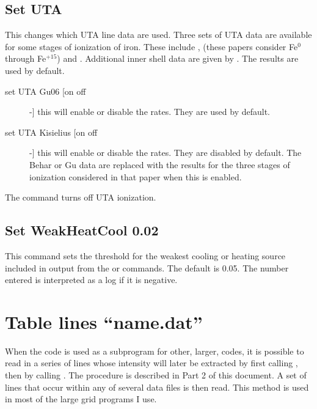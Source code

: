 \subsection{Set UTA}

This changes which UTA line data are used.
Three sets of UTA data are
available for some stages of ionization of iron.
These include \citet{Behar2001}, \citet{Gu2006}
(these papers consider Fe$^0$ through Fe$^{+15}$) and
\citet[this includes Fe$^{+13}$
though Fe$^{+15}$ but has many more lines]{Kisielius2003}.
Additional inner shell data are given by \citet{Behar2002}.
The \citet{Gu2006} results are used by default.
\begin{description}
\item[set UTA Gu06 [on off] -] this will enable or disable the \citet{Gu2006}
rates.  They are used by default.

\item[set UTA Kisielius [on off] -] this will enable or disable the \citet{Kisielius2003} rates.  They are disabled by default.  The Behar or Gu data
are replaced with the \citet{Kisielius2003} results for the three stages
of ionization considered in that paper when this is enabled.
\end{description}

The  command turns off UTA ionization.

\subsection{Set WeakHeatCool 0.02}

This command sets the threshold for the weakest cooling or heating source
included in output from the 
or  commands.
The default is 0.05.
The number entered is interpreted as a
log if it is negative.

\section{Table lines ``name.dat''}

When the code is used as a subprogram for other, larger, codes,
it is possible to read in a series of lines whose intensity will
later be extracted
by first calling ,
then by calling .
The procedure is
described in Part 2 of this document.
A set of lines that occur within
any of several data files is then read.
This method is used in most of
the large grid programs I use.

